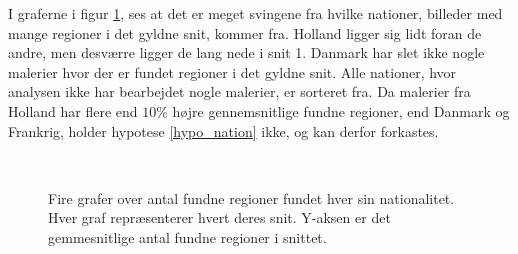 {I graferne i figur \ref{udvidet_nation}, ses at det er meget svingene
fra hvilke nationer, billeder med mange regioner i det gyldne snit,
kommer fra. Holland ligger sig lidt foran de andre, men desværre ligger
de lang nede i snit 1. Danmark har slet ikke nogle malerier hvor der er
fundet regioner i det gyldne snit. Alle nationer, hvor analysen ikke har
bearbejdet nogle malerier, er sorteret fra. Da malerier fra Holland har
flere end $10\%$ højre gennemsnitlige fundne regioner, end Danmark og
Frankrig, holder hypotese \ref{hypo_nation} ikke, og kan derfor
forkastes.

\begin{figure}[!h]
    \centering
    	\hspace{1em}
		\\
		\hspace{1em}
       \caption[]{Fire grafer over antal fundne regioner fundet hver sin
       nationalitet. Hver graf repræsenterer hvert deres snit. Y-aksen
       er det gemmesnitlige antal fundne regioner i snittet.}
     \label{udvidet_nation}
\end{figure}

}
